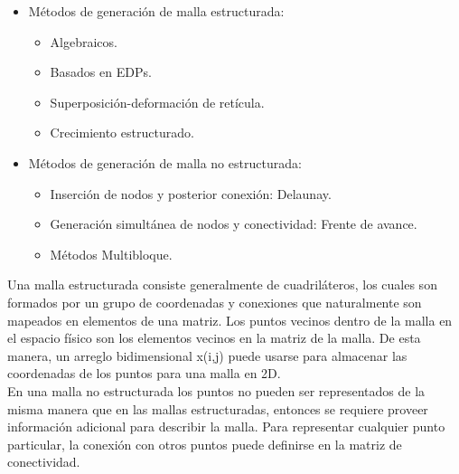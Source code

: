 \documentclass[11pt,letterpaper]{article}
\begin{document}
\begin{itemize}
    \item Métodos de generación de malla estructurada:
     \begin{itemize}
         \item Algebraicos.
         \item Basados en EDPs.
         \item Superposición-deformación de retícula.
         \item Crecimiento estructurado.
    \end{itemize}
    \item Métodos de generación de malla no estructurada:
    \begin{itemize}
         \item Inserción de nodos y posterior conexión: Delaunay.
         \item Generación simultánea de nodos y conectividad: Frente de avance.
         \item Métodos Multibloque.
    \end{itemize}
\end{itemize}

 



Una malla estructurada consiste generalmente de cuadriláteros, los cuales son formados por un grupo de coordenadas y conexiones que naturalmente son mapeados en elementos de una matriz. Los puntos vecinos dentro de la malla en el espacio físico son los elementos vecinos en la matriz de la malla. De esta manera, un arreglo bidimensional x(i,j) puede usarse para almacenar las coordenadas de los puntos para una malla en 2D.\\

En una malla no estructurada los puntos no pueden ser representados de la misma manera que en las mallas estructuradas, entonces se requiere proveer información adicional para describir la malla. Para representar cualquier punto particular, la conexión con otros puntos puede definirse en la matriz de conectividad.
\end{document}
